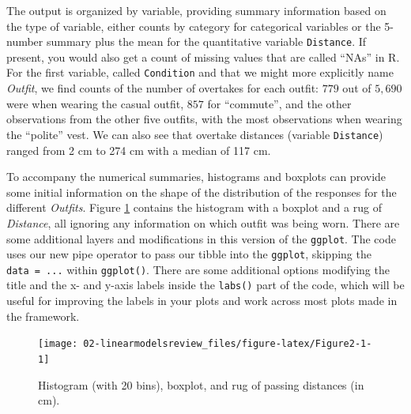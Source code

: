 \documentclass[
]{book}
\begin{document}
\normalsize

The output is organized by variable,
providing summary information based on the type of
variable, either counts by category for categorical variables or the 5-number summary plus the mean for the quantitative
variable \texttt{Distance}. If present, you would also get a count of missing values that are
called ``NAs'' in R.  For the first variable, called \texttt{Condition} and that we might more explicitly name \emph{Outfit}, we find counts of the
number of overtakes for each outfit: \(779\) out of \(5,690\) were when wearing the casual outfit, \(857\) for ``commute'', and the other observations from the other five outfits, with the most observations when wearing the ``polite'' vest.
We can also see that overtake distances (variable
\texttt{Distance}) ranged from 2 cm to 274 cm with a median of 117 cm.

\indent To accompany the numerical summaries, histograms and boxplots can
provide some initial information on the shape of the distribution of
the responses for the different \emph{Outfits}. Figure \ref{fig:Figure2-1}
contains the histogram with a boxplot and a rug of \emph{Distance}, all ignoring any information on which outfit was being worn. There are some additional layers and modifications in this version of the \texttt{ggplot}. The code uses our new pipe operator to pass our tibble into the \texttt{ggplot}, skipping the \texttt{data\ =\ ...} within \texttt{ggplot()}. There are some additional options modifying the title and the x- and y-axis labels inside the \texttt{labs()} part of the code, which will be useful for improving the labels in your plots and work across most plots made in the framework.



\begin{figure}[ht!]

{\centering \texttt{[image: 02-linearmodelsreview\_files/figure-latex/Figure2-1-1]} 

}

\caption{Histogram (with 20 bins), boxplot, and rug of passing distances (in cm).}\label{fig:Figure2-1}
\end{figure}
\end{document}
